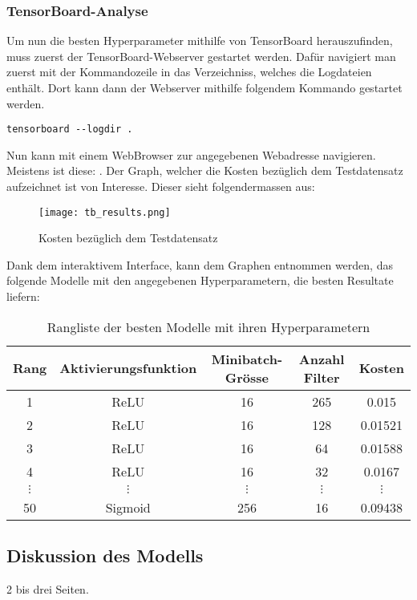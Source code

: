 \subsubsection{TensorBoard-Analyse}
Um nun die besten Hyperparameter mithilfe von TensorBoard herauszufinden, muss
zuerst der TensorBoard-Webserver gestartet werden. Dafür navigiert man zuerst
mit der Kommandozeile in das Verzeichniss, welches die Logdateien enthält.
Dort kann dann der Webserver mithilfe folgendem Kommando gestartet werden.
\begin{verbatim}
tensorboard --logdir .
\end{verbatim}
Nun kann mit einem WebBrowser zur angegebenen Webadresse navigieren. Meistens
ist diese: .
Der Graph, welcher die Kosten bezüglich dem Testdatensatz aufzeichnet ist von
Interesse. Dieser sieht folgendermassen aus:
\para{}
\begin{figure}[h!]
  \centering
  \texttt{[image: tb\_results.png]}
  \caption{Kosten bezüglich dem Testdatensatz}
\end{figure}
\para{}
Dank dem interaktivem Interface, kann dem Graphen entnommen werden, das folgende
Modelle mit den angegebenen Hyperparametern, die besten Resultate liefern:

\para{}
\begin{table}[h!]
  \centering
  \begin{tabular}{ |c|c|c|c|c| }
    \hline
    Rang & Aktivierungsfunktion & Minibatch-Grösse & Anzahl Filter & Kosten \\
    \hline
    1 & ReLU & 16 & 265 & 0.015 \\
    2 & ReLU & 16 & 128 & 0.01521 \\
    3 & ReLU & 16 & 64 & 0.01588 \\
    4 & ReLU & 16 & 32 & 0.0167 \\
    $\vdots$ & $\vdots$ & $\vdots$ & $\vdots$ & $\vdots$ \\
    50 & Sigmoid & 256 & 16 & 0.09438 \\
    \hline
  \end{tabular}
  \caption{Rangliste der besten Modelle mit ihren Hyperparametern}
\end{table}
\para{}


\subsection{Diskussion des Modells}
2 bis drei Seiten.


